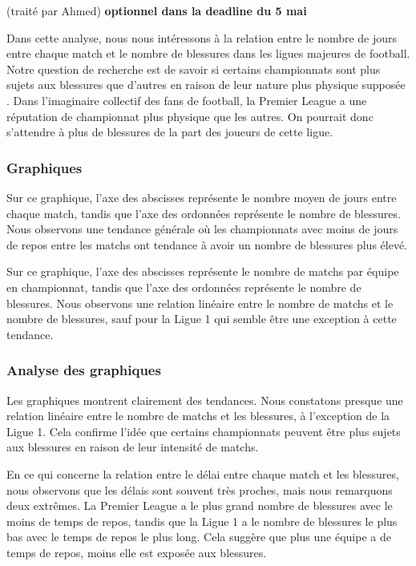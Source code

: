 \documentclass[
]{article}
\begin{document}
(traité par Ahmed) \textbf{optionnel dans la deadline du 5 mai}

Dans cette analyse, nous nous intéressons à la relation entre le nombre
de jours entre chaque match et le nombre de blessures dans les ligues
majeures de football. Notre question de recherche est de savoir si
certains championnats sont plus sujets aux blessures que d'autres en
raison de leur nature plus physique supposée . Dans l'imaginaire
collectif des fans de football, la Premier League a une réputation de
championnat plus physique que les autres. On pourrait donc s'attendre à
plus de blessures de la part des joueurs de cette ligue.

\subsubsection{Graphiques}\label{graphiques}

Sur ce graphique, l'axe des abscisses représente le nombre moyen de
jours entre chaque match, tandis que l'axe des ordonnées représente le
nombre de blessures. Nous observons une tendance générale où les
championnats avec moins de jours de repos entre les matchs ont tendance
à avoir un nombre de blessures plus élevé.

Sur ce graphique, l'axe des abscisses représente le nombre de matchs par
équipe en championnat, tandis que l'axe des ordonnées représente le
nombre de blessures. Nous observons une relation linéaire entre le
nombre de matchs et le nombre de blessures, sauf pour la Ligue 1 qui
semble être une exception à cette tendance.

\subsubsection{Analyse des graphiques}\label{analyse-des-graphiques-1}

Les graphiques montrent clairement des tendances. Nous constatons
presque une relation linéaire entre le nombre de matchs et les
blessures, à l'exception de la Ligue 1. Cela confirme l'idée que
certains championnats peuvent être plus sujets aux blessures en raison
de leur intensité de matchs.

En ce qui concerne la relation entre le délai entre chaque match et les
blessures, nous observons que les délais sont souvent très proches, mais
nous remarquons deux extrêmes. La Premier League a le plus grand nombre
de blessures avec le moins de temps de repos, tandis que la Ligue 1 a le
nombre de blessures le plus bas avec le temps de repos le plus long.
Cela suggère que plus une équipe a de temps de repos, moins elle est
exposée aux blessures.
\end{document}
